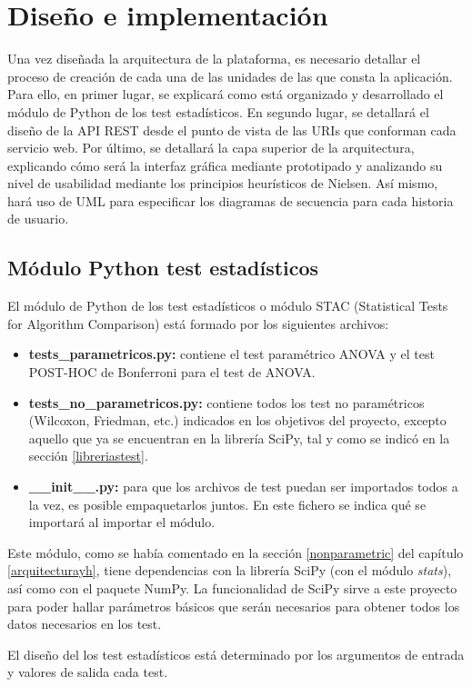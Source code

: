 \chapter{Diseño e implementación}
Una vez diseñada la arquitectura de la plataforma, es necesario detallar el proceso de creación de cada una de las unidades de las que consta la aplicación. Para ello, en primer lugar, se explicará como está organizado y desarrollado el módulo de Python de los test estadísticos. En segundo lugar, se detallará el diseño de la API REST desde el punto de vista de las URIs que conforman cada servicio web. Por último, se detallará la capa superior de la arquitectura, explicando cómo será la interfaz gráfica mediante prototipado y analizando su nivel de usabilidad mediante los principios heurísticos de Nielsen. Así mismo, hará uso de UML para especificar los diagramas de secuencia para cada historia de usuario.

\section{Módulo Python test estadísticos}
El módulo de Python de los test estadísticos o módulo STAC (Statistical Tests for Algorithm Comparison) está formado por los siguientes archivos:
\begin{itemize}
\item \textbf{tests\_parametricos.py:} contiene el test paramétrico ANOVA y el test POST-HOC de Bonferroni para el test de ANOVA.
\item \textbf{tests\_no\_parametricos.py:} contiene todos los test no paramétricos (Wilcoxon, Friedman, etc.) indicados en los objetivos del proyecto, excepto aquello que ya se encuentran en la librería SciPy, tal y como se indicó en la sección \ref{libreriastest}.
\item \textbf{\_\_init\_\_.py:} para que los archivos de test puedan ser importados todos a la vez, es posible empaquetarlos juntos. En este fichero se indica qué se importará al importar el módulo.
\end{itemize}
Este módulo, como se había comentado en la sección \ref{nonparametric} del capítulo \ref{arquitecturayh}, tiene dependencias con la librería SciPy (con el módulo \textit{stats}), así como con el paquete NumPy. La funcionalidad de SciPy sirve a este proyecto para poder hallar parámetros básicos que serán necesarios para obtener todos los datos necesarios en los test.

El diseño del los test estadísticos está determinado por los argumentos de entrada y valores de salida cada test.

